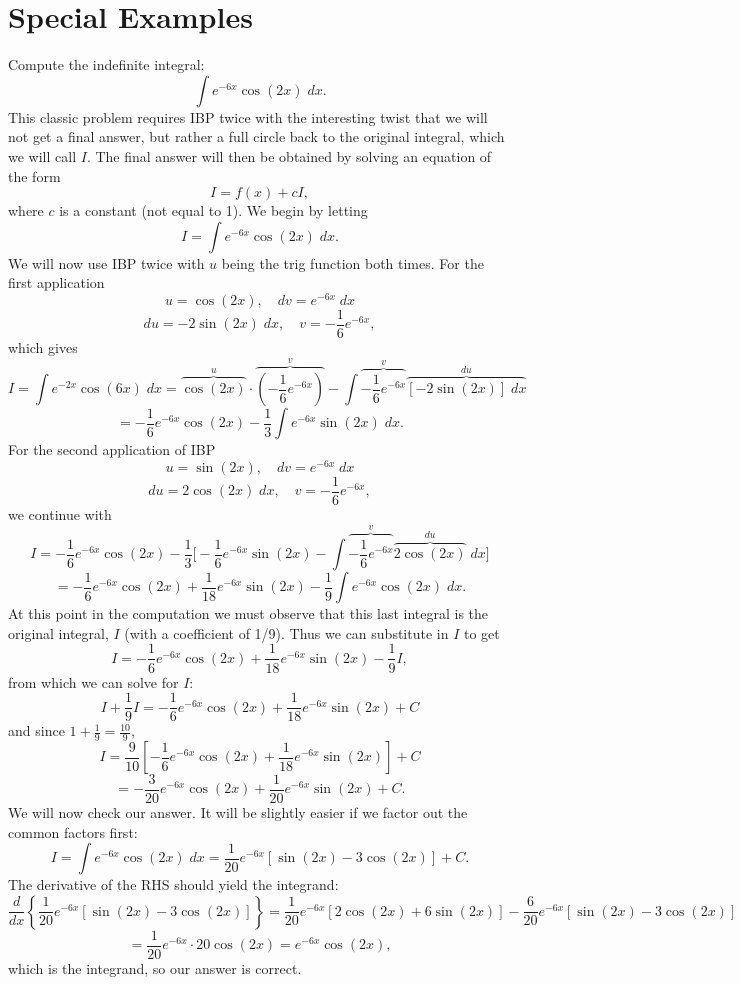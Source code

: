 \documentclass[handout]{ximera}
\begin{document}
\section{Special Examples}

\begin{example}[example 9]
Compute the indefinite integral:
\[
\int e^{-6x}\cos(2x) \; dx.
\]
This classic problem requires IBP twice with the interesting twist that we will not get a final answer, but rather 
a full circle back to the original integral, which we will call $I$.  The final answer will then be obtained by solving an equation 
of the form
\[
I = f(x) + cI,
\]
where $c$ is a constant (not equal to 1).
We begin by letting 
\[
I = \int e^{-6x}\cos(2x) \; dx.
\]
We will now use IBP twice with $u$ being the trig function both times.
For the first application
\[
u = \cos(2x), \quad dv = e^{-6x} \; dx
\]
\[
du = -2\sin(2x) \; dx,  \quad v = -\frac16 e^{-6x},
\]
which gives
\[
I = \int e^{-2x}\cos(6x) \; dx = \overbrace{\cos(2x)}^{u} \cdot 
\overbrace{\left(-\frac16 e^{-6x}\right)}^{v} - \int \overbrace{-\frac16 e^{-6x}}^{v} \overbrace{[-2\sin(2x)] \; dx}^{du}
\]
\[
= -\frac16 e^{-6x}\cos(2x) - \frac13\int  e^{-6x}\sin(2x) \; dx.
\]
For the second application of IBP
\[
u = \sin(2x), \quad dv = e^{-6x} \; dx
\]
\[
du = 2\cos(2x) \; dx,  \quad v = -\frac16 e^{-6x},
\]
we continue with
\[
I = -\frac16 e^{-6x}\cos(2x) - \frac13\Big[ -\frac16 e^{-6x}\sin(2x) - \int  \overbrace{-\frac16 e^{-6x}}^{v} \overbrace{ 2\cos(2x)}^{du} \; dx    \Big]
\]
\[
= -\frac16 e^{-6x}\cos(2x) + \frac{1}{18} e^{-6x}\sin(2x) - \frac19 \int e^{-6x} \cos(2x) \; dx. 
\]
At this point in the computation we must observe that this last integral is the original integral, $I$ (with a coefficient of 1/9). 
Thus we can substitute in $I$ to get
\[
I = -\frac16 e^{-6x}\cos(2x) + \frac{1}{18} e^{-6x}\sin(2x) - \frac19 I,
\]
from which we can solve for $I$:
\[
I + \frac19 I = -\frac16 e^{-6x}\cos(2x) + \frac{1}{18} e^{-6x}\sin(2x) + C
\]
and since $1+\frac19 = \frac{10}{9}$, 
\[
I = \frac{9}{10} \left[-\frac16 e^{-6x}\cos(2x) + \frac{1}{18} e^{-6x}\sin(2x)\right] + C
\]
\[
= -\frac{3}{20} e^{-6x}\cos(2x) + \frac{1}{20} e^{-6x}\sin(2x) + C.
\]
We will now check our answer. It will be slightly easier if we factor out the common factors first:
\[
I = \int e^{-6x}\cos(2x) \; dx = \frac{1}{20} e^{-6x} \left[\sin(2x) - 3\cos(2x)\right] + C.
\]
The derivative of the RHS should yield the integrand:
\[
\frac{d}{dx}\left\{\frac{1}{20} e^{-6x} \left[\sin(2x) - 3\cos(2x)\right]\right\}    = \frac{1}{20} e^{-6x}\left[2\cos(2x) + 6\sin(2x)\right] 
- \frac{6}{20} e^{-6x} \left[\sin(2x) - 3\cos(2x)\right] 
\]
\[
= \frac{1}{20} e^{-6x} \cdot 20\cos(2x) = e^{-6x} \cos(2x),
\]
which is the integrand, so our answer is correct.
\end{example}
\end{document}
